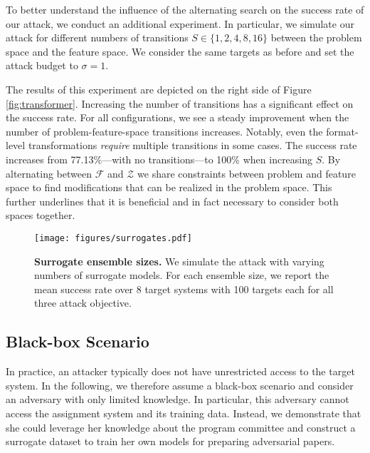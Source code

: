 \documentclass[letterpaper,twocolumn,10pt]{article}
\newcommand{\switches}{S}
\newcommand{\attackbudgetscale}{\sigma}
\newcommand{\Dom}{\ensuremath{\mathcal{Z}}\xspace}
\newcommand{\F}{\ensuremath{\mathcal{F}}\xspace}
\begin{document}
To better understand the influence of the alternating search on the success rate of our attack, we conduct an additional experiment. In particular, we simulate our attack for different numbers of transitions $\switches \in \{1, 2, 4, 8, 16\}$ between the problem space and the feature space. We consider the same targets as before and set the attack budget to $\attackbudgetscale = 1$.

The results of this experiment are depicted on the right side of Figure \ref{fig:transformer}. Increasing the number of transitions has a significant effect on the success rate. For all configurations, we see a steady improvement when the number of problem-feature-space transitions increases.
Notably, even the format-level transformations \emph{require} multiple transitions in some cases. The success rate increases from 77.13\%---with no transitions---to 100\% when increasing $\switches$. By alternating between $\F$ and $\Dom$ we share constraints between problem and feature space to find modifications that can be realized in the problem space. This further {underlines\EndAccSupp{}} that it is beneficial and in fact necessary to consider both spaces together.

\begin{figure}[t]
    \centering
  	\texttt{[image: figures/surrogates.pdf]}
    \caption{\textbf{Surrogate ensemble sizes.} We simulate the attack with varying numbers of surrogate models. For each ensemble size, we report the mean success rate over 8 target systems with 100 targets each for all three attack objective.}
    \label{fig:surrogates}
\end{figure} \subsection{Black-box Scenario} 

In practice, an attacker typically does not have {unrestricted\EndAccSupp{}} access to the target system. In the following, we therefore assume a black-box scenario and consider an adversary with only limited knowledge. In particular, this adversary cannot access the assignment system and its training data. Instead, we demonstrate that she could leverage her knowledge about the program {committee\EndAccSupp{}} and construct a {surrogate\EndAccSupp{}} dataset to train her own models for preparing adversarial papers.
\end{document}
